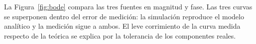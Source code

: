 La Figura~\ref{fig:bode} compara las tres fuentes en magnitud y fase. Las tres curvas se superponen dentro del error de medición: la simulación reproduce el modelo analítico y la medición sigue a ambos. El leve corrimiento de la curva medida respecto de la teórica se explica por la tolerancia de los componentes reales.
